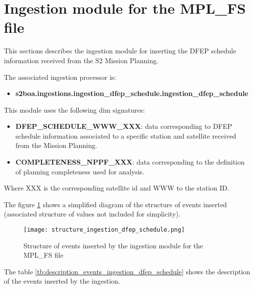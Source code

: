 \section{Ingestion module for the MPL\_FS file}

This sections describes the ingestion module for inserting the DFEP schedule information received from the S2 Mission Planning.

The associated ingestion processor is:

\begin{itemize} 

\item \textbf{s2boa.ingestions.ingestion\_dfep\_schedule.ingestion\_dfep\_schedule}
  
\end{itemize}

This module uses the following \acrshort{dim} signatures:

\begin{itemize} 

\item \textbf{DFEP\_SCHEDULE\_WWW\_XXX}: data corresponding to DFEP schedule information associated to a specific station and satellite received from the Mission Planning.

\item \textbf{COMPLETENESS\_NPPF\_XXX}: data corresponding to the definition of planning completeness used for analysis.
  
\end{itemize}

Where XXX is the corresponding satellite id and WWW to the station ID.

The figure \ref{fg:structure_ingestion_dfep_schedule} shows a simplified diagram of the structure of events inserted (associated structure of values not included for simplicity).

\begin{figure}[H]
  \begin{center}
	\centering\texttt{[image: structure\_ingestion\_dfep\_schedule.png]}
	\caption{Structure of events inserted by the ingestion module for the MPL\_FS file}
	\label{fg:structure_ingestion_dfep_schedule}
  \end{center}
\end{figure}

The table \ref{tb:description_events_ingestion_dfep_schedule} shows the description of the events inserted by the ingestion.

